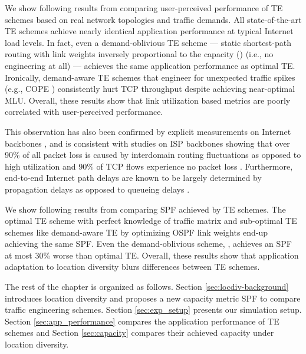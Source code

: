 We show following results from comparing user-perceived performance of TE schemes based on real network topologies and traffic demands. All state-of-the-art TE schemes achieve nearly identical application performance at typical Internet load levels. In fact, even a demand-oblivious TE scheme --- static shortest-path routing with link weights inversely proportional to the capacity (\invcap) (i.e., no engineering at all) --- achieves the same application performance as optimal TE. Ironically, demand-aware TE schemes that engineer for unexpected traffic spikes (e.g., COPE \cite{COPE}) consistently hurt TCP throughput despite achieving near-optimal MLU. Overall, these results show that link utilization based metrics are poorly correlated with user-perceived performance.

 This observation has also been confirmed by explicit measurements on Internet backbones \cite{ExpRouterBuffer}, and is consistent with studies on ISP backbones showing that over 90\% of all packet loss is caused by interdomain routing fluctuations as opposed to high utilization \cite{SprintStudy} and 90\% of TCP flows experience no packet loss \cite{SprintBackbone}. Furthermore, end-to-end Internet path delays are known to be largely determined by propagation delays as opposed to queueing delays \cite{SprintBackbone,SingleHopDelay}.

We show following results from comparing SPF achieved by TE schemes. The optimal TE scheme with perfect knowledge of traffic matrix and sub-optimal TE schemes like demand-aware TE by optimizing OSPF link weights \cite{fortz2000internet} end-up achieving the same SPF. Even the demand-oblivious scheme, \invcap, achieves an SPF at most 30\% worse than optimal TE. Overall, these results show that application adaptation to location diversity blurs differences between TE schemes.

The rest of the chapter is organized as follows. Section \ref{sec:locdiv-background} introduces location diversity and proposes a new capacity metric SPF to compare traffic engineering schemes. Section \ref{sec:exp_setup} presents our simulation setup. Section \ref{sec:app_performance} compares the application performance of TE schemes and Section \ref{sec:capacity} compares their achieved capacity under location diversity.



